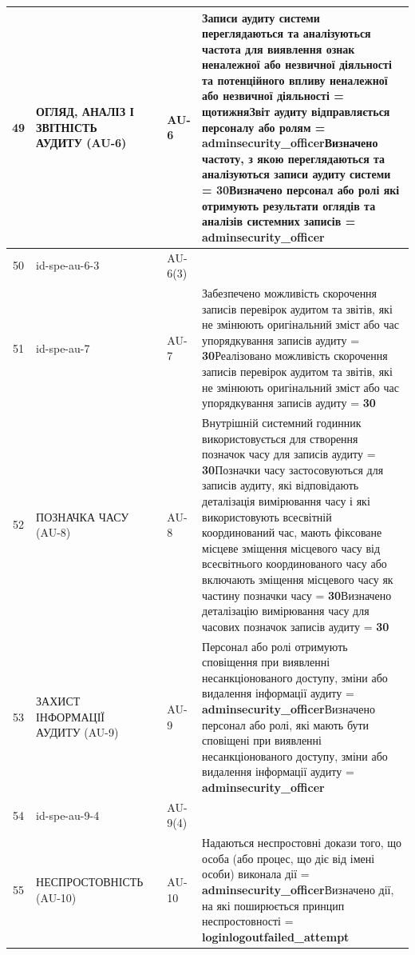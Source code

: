 \documentclass[10pt]{article}
\begin{document}
\begin{longtable}{|c|>{\raggedright\arraybackslash}p{4cm}|>{\raggedright\arraybackslash}p{2.5cm}|>{\raggedright\arraybackslash}p{3.5cm}|>{\raggedright\arraybackslash}p{5.5cm}|}
49 & ОГЛЯД, АНАЛІЗ І ЗВІТНІСТЬ АУДИТУ (AU-6) &  & AU-6 & Записи аудиту системи переглядаються та аналізуються частота для виявлення ознак неналежної або незвичної діяльності та потенційного впливу неналежної або незвичної діяльності = \textbf{щотижня}\newline Звіт аудиту відправляється персоналу або ролям = \textbf{adminsecurity\_\allowbreak{}officer}\newline Визначено частоту, з якою переглядаються та аналізуються записи аудиту системи = \textbf{30}\newline Визначено персонал або ролі які отримують результати оглядів та аналізів системних записів = \textbf{adminsecurity\_\allowbreak{}officer} \\ \hline
50 & id-spe-au-6-3 &  & AU-6(3) &  \\ \hline
51 & id-spe-au-7 &  & AU-7 & Забезпечено можливість скорочення записів перевірок аудитом та звітів, які не змінюють оригінальний зміст або час упорядкування записів аудиту = \textbf{30}\newline Реалізовано можливість скорочення записів перевірок аудитом та звітів, які не змінюють оригінальний зміст або час упорядкування записів аудиту = \textbf{30} \\ \hline
52 & ПОЗНАЧКА ЧАСУ (AU-8) &  & AU-8 & Внутрішній системний годинник використовується для створення позначок часу для записів аудиту = \textbf{30}\newline Позначки часу застосовуються для записів аудиту, які відповідають деталізація вимірювання часу і які використовують всесвітній координований час, мають фіксоване місцеве зміщення місцевого часу від всесвітнього координованого часу або включають зміщення місцевого часу як частину позначки часу = \textbf{30}\newline Визначено деталізацію вимірювання часу для часових позначок записів аудиту = \textbf{30} \\ \hline
53 & ЗАХИСТ ІНФОРМАЦІЇ АУДИТУ (AU-9) &  & AU-9 & Персонал або ролі отримують сповіщення при виявленні несанкціонованого доступу, зміни або видалення інформації аудиту = \textbf{adminsecurity\_\allowbreak{}officer}\newline Визначено персонал або ролі, які мають бути сповіщені при виявленні несанкціонованого доступу, зміни або видалення інформації аудиту = \textbf{adminsecurity\_\allowbreak{}officer} \\ \hline
54 & id-spe-au-9-4 &  & AU-9(4) &  \\ \hline
55 & НЕСПРОСТОВНІСТЬ (AU-10) &  & AU-10 & Надаються неспростовні докази того, що особа (або процес, що діє від імені особи) виконала дії = \textbf{adminsecurity\_\allowbreak{}officer}\newline Визначено дії, на які поширюється принцип неспростовності = \textbf{loginlogoutfailed\_\allowbreak{}attempt} \\ \hline

\end{longtable}
\end{document}
